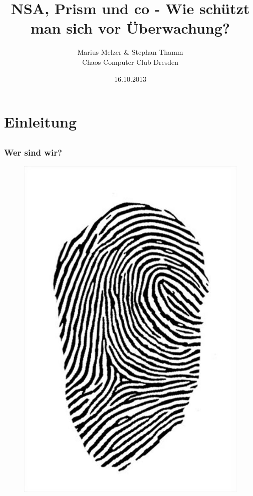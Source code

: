 \documentclass[12pt]{beamer}
\title{NSA, Prism und co - Wie schützt man sich vor Überwachung?}
\author{\small Marius Melzer \& Stephan Thamm\\\large Chaos Computer Club Dresden}
\date{16.10.2013}
\begin{document}
\maketitle

\section{Einleitung}
\subsection{}

\begin{frame}
  \frametitle{Wer sind wir?}
  \begin{figure}
    \includegraphics[height=0.7\textheight]{img/fingerabdruck.jpg}
  \end{figure}
\end{frame}
\end{document}
